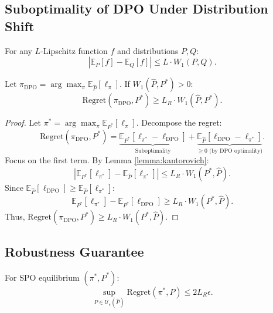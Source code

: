 
\subsection{Suboptimality of DPO Under Distribution Shift}

\begin{lemma}
\label{lemma:kantorovich}
For any \( L \)-Lipschitz function \( f \) and distributions \( P, Q \):
\[
\left| \mathbb{E}_{P}[f] - \mathbb{E}_{Q}[f] \right| \leq L \cdot W_1(P, Q).
\]
\end{lemma}

\begin{theorem}
\label{thm:dpo_suboptimal}
Let \( \pi_{\text{DPO}} = \arg\max_\pi \mathbb{E}_{\hat{P}}[\ell_\pi] \). If \( W_1(\hat{P}, P^*) > 0 \):
\[
\text{Regret}(\pi_{\text{DPO}}, P^*) \geq L_R \cdot W_1(\hat{P}, P^*).
\]
\end{theorem}

\begin{proof}
Let \( \pi^* = \arg\max_\pi \mathbb{E}_{P^*}[\ell_\pi] \). Decompose the regret:
\[
\text{Regret}(\pi_{\text{DPO}}, P^*) = \underbrace{\mathbb{E}_{P^*}[\ell_{\pi^*} - \ell_{\text{DPO}}]}_{\text{Suboptimality}} + \underbrace{\mathbb{E}_{\hat{P}}[\ell_{\text{DPO}} - \ell_{\pi^*}]}_{\geq 0 \text{ (by DPO optimality)}}.
\]
Focus on the first term. By Lemma \ref{lemma:kantorovich}:
\[
\left| \mathbb{E}_{P^*}[\ell_{\pi^*}] - \mathbb{E}_{\hat{P}}[\ell_{\pi^*}] \right| \leq L_R \cdot W_1(P^*, \hat{P}).
\]
Since \( \mathbb{E}_{\hat{P}}[\ell_{\text{DPO}}] \geq \mathbb{E}_{\hat{P}}[\ell_{\pi^*}] \):
\[
\mathbb{E}_{P^*}[\ell_{\pi^*}] - \mathbb{E}_{P^*}[\ell_{\text{DPO}}] \geq L_R \cdot W_1(P^*, \hat{P}).
\]
Thus, \( \text{Regret}(\pi_{\text{DPO}}, P^*) \geq L_R \cdot W_1(P^*, \hat{P}) \).
\end{proof}


\subsection{Robustness Guarantee}

\begin{theorem}
\label{thm:robustness}
For SPO equilibrium \( (\pi^*, P^*) \):
\[
\sup_{P \in \mathcal{U}_\epsilon(\hat{P})} \text{Regret}(\pi^*, P) \leq 2L_R \epsilon.
\]
\end{theorem}

